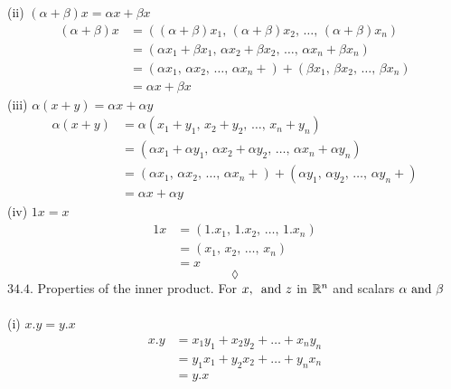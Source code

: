 (ii) $(\alpha + \beta)x = \alpha x + \beta x$\\
\begin{align*}
(\alpha + \beta)x 
&= ((\alpha+\beta) x_1,\, (\alpha+\beta) x_2,\,\dots ,\,(\alpha + \beta) x_n)\\
&= (\alpha x_1 +\beta x_1,\, \alpha x_2+\beta x_2,\,\dots ,\,\alpha x_n + \beta x_n)\\
&= (\alpha x_1,\, \alpha x_2,\,\dots ,\,\alpha x_n + )+ (\beta x_1,\, \beta x_2,\,\dots ,\, \beta x_n)\\
&= \alpha x + \beta x
\end{align*}
(iii) $\alpha(x + y) = \alpha x + \alpha y$\\
\begin{align*}
\alpha(x + y)
&= \alpha( x_1+y_1,\, x_2+y_2,\,\dots ,\, x_n+y_n)\\
&= ( \alpha x_1+\alpha y_1,\, \alpha x_2+\alpha y_2,\,\dots ,\, \alpha x_n+\alpha y_n)\\
&= (\alpha x_1,\, \alpha x_2,\,\dots ,\,\alpha x_n + )+ (\alpha y_1,\, \alpha y_2,\,\dots ,\,\alpha y_n + )\\
&= \alpha x + \alpha y
\end{align*}
(iv) $1x = x$\\
\begin{align*}
1x
&= ( 1.x_1,\, 1.x_2,\,\dots ,\, 1.x_n)\\
&= (x_1,\, x_2,\,\dots ,\, x_n)\\
&=x
\end{align*}
$$\lozenge$$
$\mathbf{34.4}$. Properties of the inner product. For $x,\,\text{ and } z $ in $\mathbb{R}^n$ and scalars $\alpha\text{ and } \beta$\\\\
(i) $x . y = y . x$\\
\begin{align*}
x . y &= x_1 y_1+x_2 y_2+\dots + x_n y_n\\
&= y_1 x_1+y_2 x_2+\dots + y_n x_n\\
&= y.x
\end{align*}

